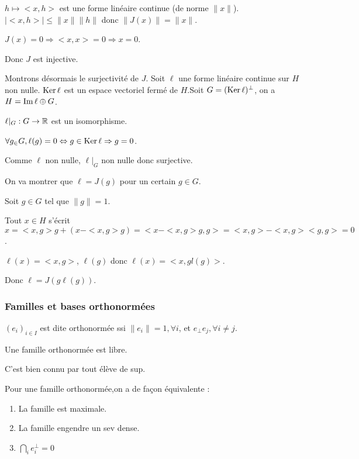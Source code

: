 \documentclass[10pt,a4paper,notitlepage ]{report}
\begin{document}
\begin{demo}
	$h\mapsto <x,h>$ est une forme linéaire continue (de norme $\|x\|$). $|<x,h>|\le \|x\|\|h\|$ donc $\|J(x)\| = \|x\|$.
	
	$J(x) = 0 \Rightarrow <x,x>=0 \Rightarrow x=0$.
	
	Donc $J$ est injective.
	
	Montrons désormais le surjectivité de $J$.
	Soit $\ell$ une forme linéaire continue sur $H$ non nulle. $\operatorname{Ker} \ell$ est un espace vectoriel fermé de $H$.Soit $G=(\operatorname{Ker} \ell)^\perp$, on a $H=\operatorname{Im} \ell \oplus G$.
	
	$\ell|_G : G \rightarrow \mathbb R$ est un isomorphisme.
	
	$\forall g_\in G, \ell(g)=0 \Leftrightarrow g \in \operatorname{Ker}\ell \Rightarrow g=0$.
	
	Comme $\ell$ non nulle, $\ell|_G$ non nulle donc surjective.
	
	On va montrer que $\ell = J(g)$ pour un certain $g\in G$.
	
	Soit $g\in G$ tel que $\|g\|=1$.
	
	Tout $x\in H$ s'écrit $x=<x,g>g + (x-<x,g>g) = <x-<x,g>g,g> = <x,g>-<x,g><g,g> = 0$.
	
	$\ell(x) = <x,g>$, $\ell(g)$ donc $\ell(x) = <x,gl(g)>$.
	
	Donc $\ell=J(g\ell(g))$.
\end{demo}

\subsubsection{Familles et bases orthonormées}

$(e_i)_{i\in I}$ est dite orthonormée ssi $\|e_i\| = 1, \forall i$, et $e_\perp e_j, \forall i \neq j$.

Une famille orthonormée est libre.
\begin{demo}
	C'est bien connu par tout élève de sup.
\end{demo}

\begin{propriete}
	Pour une famille orthonormée,on a de façon équivalente :
	\begin{enumerate}
		\item La famille est maximale.
		\item La famille engendre un sev dense.
		\item $\bigcap_i e_i^\perp=0$
	\end{enumerate}
\end{propriete}
\end{document}
